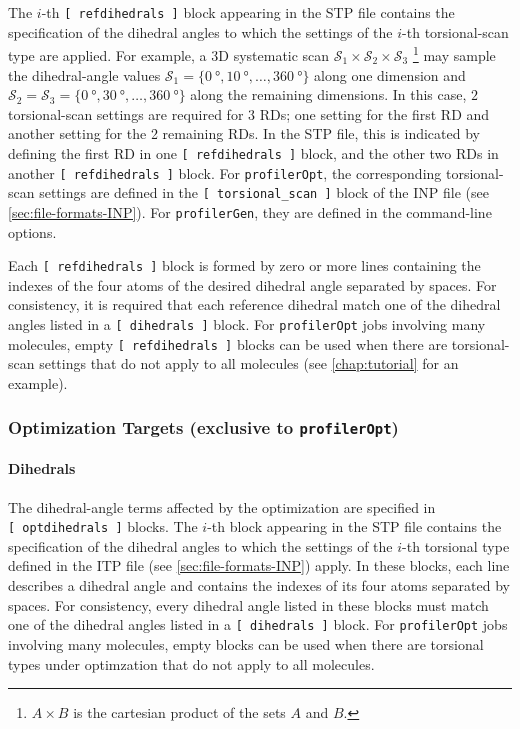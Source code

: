 \documentclass[10pt,a4paper,openany]{memoir}
\numberwithin{equation}{section}
\newcommand{\profileropt}[0]{\texttt{profilerOpt}}
\newcommand{\profilergen}[0]{\texttt{profilerGen}}
\begin{document}
The $i$-th \texttt{[~refdihedrals~]} block appearing in the STP file
contains the specification of the dihedral angles to which the
settings of the $i$-th torsional-scan type are applied.
%
For example, a 3D systematic scan
$\mathcal{S}_1 \times \mathcal{S}_2 \times \mathcal{S}_3$
\footnote{$A \times B$ is the cartesian product of the sets $A$ and
  $B$.}  may sample the dihedral-angle values
$\mathcal{S}_1 = \{\SI{0}{\degree}, \SI{10}{\degree}, \ldots,
\SI{360}{\degree}\}$ along one dimension and
$\mathcal{S}_2 = \mathcal{S}_3 = \{\SI{0}{\degree}, \SI{30}{\degree},
\ldots, \SI{360}{\degree}\}$ along the remaining dimensions.
%
In this case, $2$ torsional-scan settings are required for $3$ RDs;
one setting for the first RD and another setting for the 2 remaining RDs.
%
In the STP file, this is indicated by defining the first RD in one
\texttt{[~refdihedrals~]} block, and the other two RDs in another
\texttt{[~refdihedrals~]} block.
%
For \profileropt{}, the corresponding torsional-scan settings are
defined in the \texttt{[~torsional\_scan~]} block of the INP file (see
\autoref{sec:file-formats-INP}).
%
For \profilergen{}, they are defined in the command-line options.

Each \texttt{[~refdihedrals~]} block is formed by zero or more lines
containing the indexes of the four atoms of the desired dihedral angle
separated by spaces. For consistency, it is required that each
reference dihedral match one of the dihedral angles listed in a
\texttt{[~dihedrals~]} block. For \profileropt{} jobs involving many
molecules, empty \texttt{[~refdihedrals~]} blocks can be used when
there are torsional-scan settings that do not apply to all molecules
(see \autoref{chap:tutorial} for an example).

\subsubsection{Optimization Targets (exclusive to \profileropt{})}
\label{sec:stp-optterms}

\paragraph{Dihedrals}

The dihedral-angle terms affected by the optimization are specified in
\texttt{[~optdihedrals~]} blocks. The $i$-th block appearing in the
STP file contains the specification of the dihedral angles to which
the settings of the $i$-th torsional type defined in the ITP file (see
\autoref{sec:file-formats-INP}) apply.  In these blocks, each line
describes a dihedral angle and contains the indexes of its four atoms
separated by spaces. For consistency, every dihedral angle listed in
these blocks must match one of the dihedral angles listed in a
\texttt{[~dihedrals~]} block.  For \profileropt{} jobs involving many
molecules, empty blocks can be used when there are torsional types
under optimzation that do not apply to all molecules.
\end{document}
